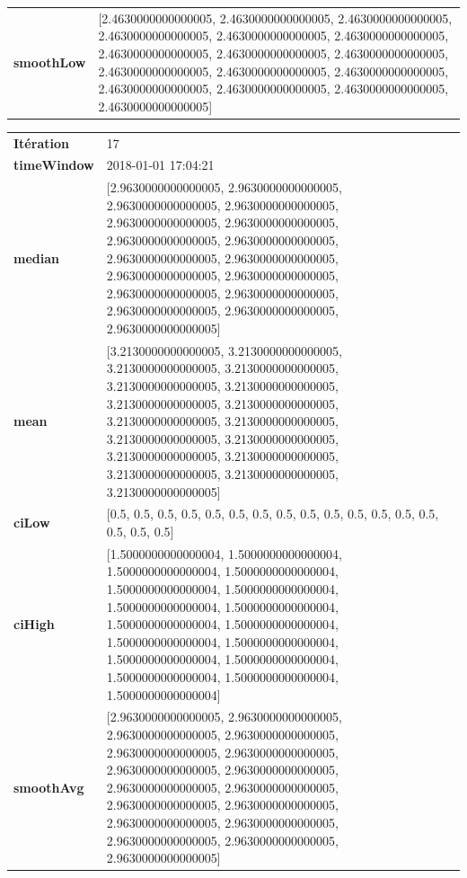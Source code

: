 		\begin{table}[H]
			\centering
			\begin{tabularx}{\textwidth}{lX}
		\textbf{smoothLow} &[2.4630000000000005, 2.4630000000000005, 2.4630000000000005, 2.4630000000000005, 2.4630000000000005, 2.4630000000000005, 2.4630000000000005, 2.4630000000000005, 2.4630000000000005, 2.4630000000000005, 2.4630000000000005, 2.4630000000000005, 2.4630000000000005, 2.4630000000000005, 2.4630000000000005, 2.4630000000000005]
		\\ 
	\end{tabularx} 
\end{table}


\begin{table}[H]
	\centering
	\begin{tabularx}{\textwidth}{lX}
		\textbf{Itération}& 17\\
		\textbf{timeWindow}	 &  2018-01-01 17:04:21  \\
		\textbf{median} & [2.9630000000000005, 2.9630000000000005, 2.9630000000000005, 2.9630000000000005, 2.9630000000000005, 2.9630000000000005, 2.9630000000000005, 2.9630000000000005, 2.9630000000000005, 2.9630000000000005, 2.9630000000000005, 2.9630000000000005, 2.9630000000000005, 2.9630000000000005, 2.9630000000000005, 2.9630000000000005, 2.9630000000000005] 
		\\ 
		\textbf{mean} & [3.2130000000000005, 3.2130000000000005, 3.2130000000000005, 3.2130000000000005, 3.2130000000000005, 3.2130000000000005, 3.2130000000000005, 3.2130000000000005, 3.2130000000000005, 3.2130000000000005, 3.2130000000000005, 3.2130000000000005, 3.2130000000000005, 3.2130000000000005, 3.2130000000000005, 3.2130000000000005, 3.2130000000000005] 
		\\
		\textbf{ciLow} & [0.5, 0.5, 0.5, 0.5, 0.5, 0.5, 0.5, 0.5, 0.5, 0.5, 0.5, 0.5, 0.5, 0.5, 0.5, 0.5, 0.5] 
		\\
		\textbf{ciHigh}& [1.5000000000000004, 1.5000000000000004, 1.5000000000000004, 1.5000000000000004, 1.5000000000000004, 1.5000000000000004, 1.5000000000000004, 1.5000000000000004, 1.5000000000000004, 1.5000000000000004, 1.5000000000000004, 1.5000000000000004, 1.5000000000000004, 1.5000000000000004, 1.5000000000000004, 1.5000000000000004, 1.5000000000000004] 
		\\
		\textbf{smoothAvg} &[2.9630000000000005, 2.9630000000000005, 2.9630000000000005, 2.9630000000000005, 2.9630000000000005, 2.9630000000000005, 2.9630000000000005, 2.9630000000000005, 2.9630000000000005, 2.9630000000000005, 2.9630000000000005, 2.9630000000000005, 2.9630000000000005, 2.9630000000000005, 2.9630000000000005, 2.9630000000000005, 2.9630000000000005] 
		\\
			\end{tabularx} 
		\end{table}
		
